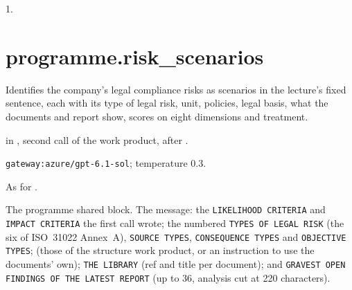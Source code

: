  1.


\section{programme.risk\_scenarios}\label{sec:aprompts:programme-risk_scenarios}

 Identifies the company's legal compliance risks as scenarios in the
lecture's fixed sentence, each with its type of legal risk, unit, policies, legal basis, what
the documents and report show, scores on eight dimensions and treatment.

  in , second call of the work
product, after .

 \texttt{gateway:azure/gpt-6.1-sol}; temperature 0.3.

 As for .

 The programme shared block. The message: the
\texttt{LIKELIHOOD CRITERIA} and \texttt{IMPACT CRITERIA} the first call wrote; the numbered
\texttt{TYPES OF LEGAL RISK} (the six of ISO~31022 Annex~A), \texttt{SOURCE TYPES},
\texttt{CONSEQUENCE TYPES} and \texttt{OBJECTIVE TYPES};  (those of the structure work
product, or an instruction to use the documents' own); \texttt{THE LIBRARY} (ref and title per
document); and \texttt{GRAVEST OPEN FINDINGS OF THE LATEST REPORT} (up to 36, analysis cut at 220
characters).

